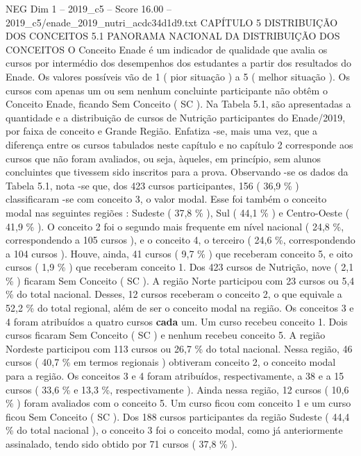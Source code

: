\begin{textsample}{NEG Dim 1 – 2019\_c5 – Score 16.00 – 2019\_c5/enade\_2019\_nutri\_acdc34d1d9.txt}  \label{ex:f1_neg_399}
CAPÍTULO 5 DISTRIBUIÇÃO DOS CONCEITOS 5.1 PANORAMA NACIONAL DA DISTRIBUIÇÃO DOS CONCEITOS O Conceito Enade é um indicador de qualidade que avalia os cursos por intermédio dos desempenhos dos estudantes a partir dos resultados do Enade.
Os valores possíveis vão de 1 ( pior situação ) a 5 ( melhor situação ).
Os cursos com apenas um ou sem nenhum concluinte participante não obtêm o Conceito Enade, ficando Sem Conceito ( SC ).
Na Tabela 5.1, são apresentadas a quantidade e a distribuição de cursos de Nutrição participantes do Enade/2019, por faixa de conceito e Grande Região.
Enfatiza -se, mais uma vez, que a diferença entre os cursos tabulados neste capítulo e no capítulo 2 corresponde aos cursos que não foram avaliados, ou seja, àqueles, em princípio, sem alunos concluintes que tivessem sido inscritos para a prova.
Observando -se os dados da Tabela 5.1, nota -se que, dos 423 cursos participantes, 156 ( 36,9 \% ) classificaram -se com conceito 3, o valor modal.
Esse foi também o conceito modal nas seguintes regiões : Sudeste ( 37,8 \% ), Sul ( 44,1 \% ) e Centro-Oeste ( 41,9 \% ).
O conceito 2 foi o segundo mais frequente em nível nacional ( 24,8 \%, correspondendo a 105 cursos ), e o conceito 4, o terceiro ( 24,6 \%, correspondendo a 104 cursos ).
Houve, ainda, 41 cursos ( 9,7 \% ) que receberam conceito 5, e oito cursos ( 1,9 \% ) que receberam conceito 1.
Dos 423 cursos de Nutrição, nove ( 2,1 \% ) ficaram Sem Conceito ( SC ).
A região Norte participou com 23 cursos ou 5,4 \% do total nacional.
Desses, 12 cursos receberam o conceito 2, o que equivale a 52,2 \% do total regional, além de ser o conceito modal na região.
Os conceitos 3 e 4 foram atribuídos a quatro cursos \textbf{cada} um.
Um curso recebeu conceito 1.
Dois cursos ficaram Sem Conceito ( SC ) e nenhum recebeu conceito 5.
A região Nordeste participou com 113 cursos ou 26,7 \% do total nacional.
Nessa região, 46 cursos ( 40,7 \% em termos regionais ) obtiveram conceito 2, o conceito modal para a região.
Os conceitos 3 e 4 foram atribuídos, respectivamente, a 38 e a 15 cursos ( 33,6 \% e 13,3 \%, respectivamente ).
Ainda nessa região, 12 cursos ( 10,6 \% ) foram avaliados com o conceito 5.
Um curso ficou com conceito 1 e um curso ficou Sem Conceito ( SC ).
Dos 188 cursos participantes da região Sudeste ( 44,4 \% do total nacional ), o conceito 3 foi o conceito modal, como já anteriormente assinalado, tendo sido obtido por 71 cursos ( 37,8 \% ).

\end{textsample}

